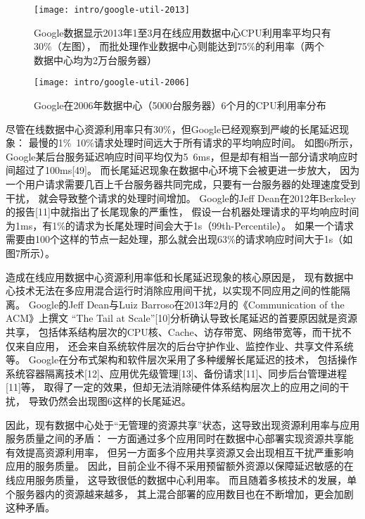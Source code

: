 \begin{figure}
\begin{minipage}{0.57\textwidth}
  \centering
  \texttt{[image: intro/google-util-2013]}
  \caption[Google数据中心CPU利用率分布（2013年）]
    {Google数据显示2013年1至3月在线应用数据中心CPU利用率平均只有30\%（左图），
     而批处理作业数据中心则能达到75\%的利用率（两个数据中心均为2万台服务器）}
  \label{fig:google-util-2013}
\end{minipage}\hfill
\begin{minipage}{0.39\textwidth}
  \centering
  \texttt{[image: intro/google-util-2006]}
  \caption[Google数据中心CPU利用率分布（2006年）]
    {Google在2006年数据中心（5000台服务器）6个月的CPU利用率分布}
  \label{fig:google-util-2006}
\end{minipage}
\end{figure}

尽管在线数据中心资源利用率只有30\%，但Google已经观察到严峻的长尾延迟现象：
最慢的1\%~10\%请求处理时间远大于所有请求的平均响应时间。
如图6所示，Google某后台服务延迟响应时间平均仅为5~6ms，但是却有相当一部分请求响应时间超过了100ms[49]。
而长尾延迟现象在数据中心环境下会被更进一步放大，
因为一个用户请求需要几百上千台服务器共同完成，只要有一台服务器的处理速度受到干扰，
就会导致整个请求的处理时间增加。
Google的Jeff Dean在2012年Berkeley的报告[11]中就指出了长尾现象的严重性，
假设一台机器处理请求的平均响应时间为1ms，有1\%的请求为长尾处理时间会大于1s（99th-Percentile）。
如果一个请求需要由100个这样的节点一起处理，那么就会出现63\%的请求响应时间大于1s（如图7所示）。

造成在线应用数据中心资源利用率低和长尾延迟现象的核心原因是，
现有数据中心技术无法在多应用混合运行时消除应用间干扰，以实现不同应用之间的性能隔离。
Google的Jeff Dean与Luiz Barroso在2013年2月的《Communication of the ACM》上撰文
“The Tail at Scale”[10]分析确认导致长尾延迟的首要原因就是资源共享，
包括体系结构层次的CPU核、Cache、访存带宽、网络带宽等，而干扰不仅来自应用，
还会来自系统软件层次的后台守护作业、监控作业、共享文件系统等。
Google在分布式架构和软件层次采用了多种缓解长尾延迟的技术，
包括操作系统容器隔离技术[12]、应用优先级管理[13]、备份请求[11]、同步后台管理进程[11]等，
取得了一定的效果，但却无法消除硬件体系结构层次上的应用之间的干扰，
导致仍然会出现图6这样的长尾延迟。

因此，现有数据中心处于“无管理的资源共享”状态，这导致出现资源利用率与应用服务质量之间的矛盾：
一方面通过多个应用同时在数据中心部署实现资源共享能有效提高资源利用率，
但另一方面多个应用共享资源又会出现相互干扰严重影响应用的服务质量。
因此，目前企业不得不采用预留额外资源以保障延迟敏感的在线应用服务质量，
这导致很低的数据中心利用率。
而且随着多核技术的发展，单个服务器内的资源越来越多，
其上混合部署的应用数目也在不断增加，更会加剧这种矛盾。


